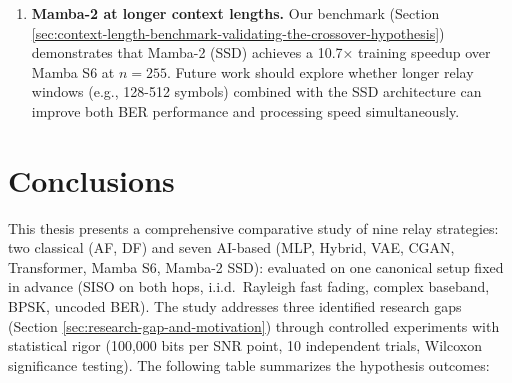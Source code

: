 \begin{enumerate}
\item
  \textbf{Mamba-2 at longer context lengths.} Our benchmark (Section \ref{sec:context-length-benchmark-validating-the-crossover-hypothesis}) demonstrates that Mamba-2 (SSD) achieves a 10.7× training speedup over Mamba S6 at \(n = 255\). Future work should explore whether longer relay windows (e.g., 128-512 symbols) combined with the SSD architecture can improve both BER performance and processing speed simultaneously.
\end{enumerate}

\section{Conclusions}\label{sec:conclusions}

This thesis presents a comprehensive comparative study of nine relay strategies: two classical (AF, DF) and seven AI-based (MLP, Hybrid, VAE, CGAN, Transformer, Mamba S6, Mamba-2 SSD): evaluated on one canonical setup fixed in advance (SISO on both hops, i.i.d.\ Rayleigh fast fading, complex baseband, BPSK, uncoded BER). The study addresses three identified research gaps (Section \ref{sec:research-gap-and-motivation}) through controlled experiments with statistical rigor (100,000 bits per SNR point, 10 independent trials, Wilcoxon significance testing). The following table summarizes the hypothesis outcomes:

